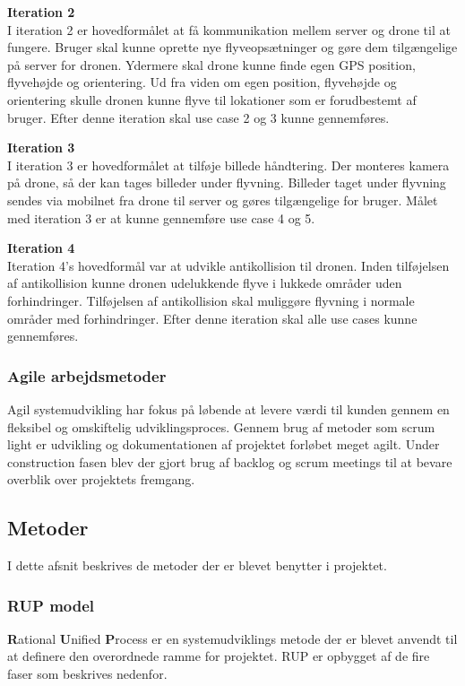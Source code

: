 \textbf{Iteration 2}\\
I iteration 2 er hovedformålet at få kommunikation mellem server og drone til at fungere. Bruger skal kunne oprette nye flyveopsætninger og gøre dem tilgængelige på server for dronen. Ydermere skal drone kunne finde egen GPS position, flyvehøjde og orientering. Ud fra viden om egen position, flyvehøjde og orientering skulle dronen kunne flyve til lokationer som er forudbestemt af bruger. Efter denne iteration skal use case 2 og 3 kunne gennemføres.

\textbf{Iteration 3}\\
I iteration 3 er hovedformålet at tilføje billede håndtering. Der monteres kamera på drone, så der kan tages billeder under flyvning. Billeder taget under flyvning sendes via mobilnet fra drone til server og gøres tilgængelige for bruger. Målet med iteration 3 er at kunne gennemføre use case 4 og 5.

\textbf{Iteration 4}\\
Iteration 4's hovedformål var at udvikle antikollision til dronen. Inden tilføjelsen af antikollision kunne dronen udelukkende flyve i lukkede områder uden forhindringer. Tilføjelsen af antikollision skal muliggøre flyvning i normale områder med forhindringer. Efter denne iteration skal alle use cases kunne gennemføres.


\subsubsection*{Agile arbejdsmetoder}
Agil systemudvikling har fokus på løbende at levere værdi til kunden gennem en fleksibel og omskiftelig udviklingsproces. Gennem brug af metoder som scrum light er udvikling og dokumentationen af projektet forløbet meget agilt. Under construction fasen blev der gjort brug af backlog og scrum meetings til at bevare overblik over projektets fremgang.


\newpage
\subsection{Metoder}
I dette afsnit beskrives de metoder der er blevet benytter i projektet.

\subsubsection*{RUP model}
\textbf{R}ational \textbf{U}nified \textbf{P}rocess er en systemudviklings metode der er blevet anvendt til at definere den overordnede ramme for projektet. RUP er opbygget af de fire faser som beskrives nedenfor.  

